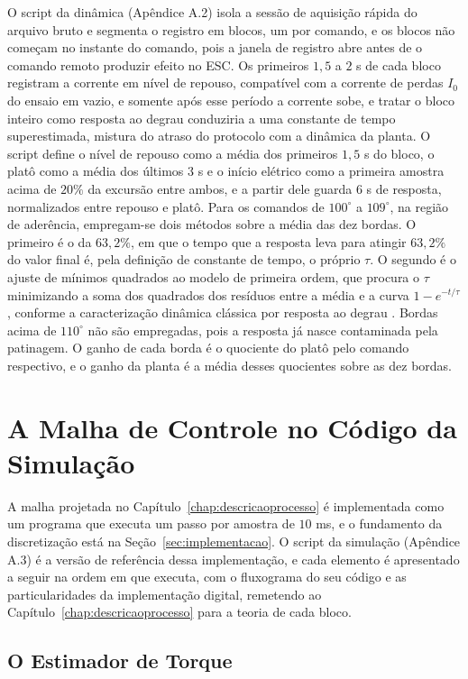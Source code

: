 O script da dinâmica (Apêndice A.2) isola a sessão de aquisição rápida do arquivo bruto e
segmenta o registro em blocos, um por comando, e os blocos não começam no instante do
comando, pois a janela de registro abre antes de o comando remoto produzir efeito no ESC.
Os primeiros $1{,}5$ a $2$ s de cada bloco registram a corrente em nível de repouso,
compatível com a corrente de perdas $I_0$ do ensaio em vazio, e somente após esse período a
corrente sobe, e tratar o bloco inteiro como resposta ao degrau conduziria a
uma constante de tempo superestimada, mistura do atraso do protocolo com a dinâmica da
planta. O script define o nível de repouso como a média dos primeiros $1{,}5$ s do bloco, o
platô como a média dos últimos $3$ s e o início elétrico como a primeira amostra acima de
$20\%$ da excursão entre ambos, e a partir dele guarda $6$ s de resposta, normalizados
entre repouso e platô. Para os comandos de $100^\circ$ a $109^\circ$, na região de
aderência, empregam-se dois métodos sobre a média das dez bordas. O primeiro é o da
$63{,}2\%$, em que o tempo que a resposta leva para atingir $63{,}2\%$ do valor final é,
pela definição de constante de tempo, o próprio $\tau$. O segundo é o ajuste de mínimos
quadrados ao modelo de primeira ordem, que procura o $\tau$ minimizando a soma dos
quadrados dos resíduos entre a média e a curva $1 - e^{-t/\tau}$, conforme a
caracterização dinâmica clássica por resposta ao degrau \cite{braga_instr_dinamica}.
Bordas acima de $110^\circ$ não são empregadas, pois a resposta já nasce contaminada
pela patinagem. O ganho de cada borda é o quociente do platô pelo comando respectivo, e o
ganho da planta é a média desses quocientes
sobre as dez bordas.

\section{A Malha de Controle no Código da Simulação}
\label{sec:codigomalha}

A malha projetada no Capítulo~\ref{chap:descricaoprocesso} é implementada como um
programa que executa um passo por amostra de $10$ ms, e o fundamento da discretização está
na Seção~\ref{sec:implementacao}. O script da simulação (Apêndice A.3) é a versão de
referência dessa implementação, e cada elemento é apresentado a seguir na ordem em que
executa, com o fluxograma do seu código e as particularidades da implementação digital,
remetendo ao Capítulo~\ref{chap:descricaoprocesso} para a teoria de cada bloco.

\subsection{O Estimador de Torque}
\label{sec:codeestimador}

